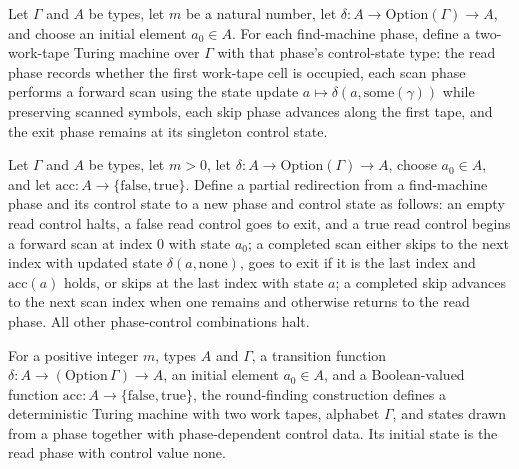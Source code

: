 \begin{definition}
\label{Turing.rt_findParts}
\leanok
{}
Let $\Gamma$ and $A$ be types, let $m$ be a natural number, let
$\delta:A\to\mathrm{Option}(\Gamma)\to A$, and choose an initial element $a_0\in A$. For
each find-machine phase, define a two-work-tape Turing machine over $\Gamma$ with that
phase's control-state type: the read phase records whether the first work-tape cell is
occupied, each scan phase performs a forward scan using the state update
$a\mapsto\delta(a,\mathrm{some}(\gamma))$ while preserving scanned symbols, each skip
phase advances along the first tape, and the exit phase remains at its singleton control
state.
\end{definition}

\begin{definition}
\label{Turing.rt_findRedirect}
\leanok
{}
Let $\Gamma$ and $A$ be types, let $m>0$, let $\delta:A\to\mathrm{Option}(\Gamma)\to A$,
choose $a_0\in A$, and let $\mathrm{acc}:A\to\{\mathrm{false},\mathrm{true}\}$. Define a
partial redirection from a find-machine phase and its control state to a new phase and
control state as follows: an empty read control halts, a false read control goes to
exit, and a true read control begins a forward scan at index $0$ with state $a_0$; a
completed scan either skips to the next index with updated state
$\delta(a,\mathrm{none})$, goes to exit if it is the last index and $\mathrm{acc}(a)$
holds, or skips at the last index with state $a$; a completed skip advances to the next
scan index when one remains and otherwise returns to the read phase. All other
phase-control combinations halt.
\end{definition}

\begin{definition}
\label{Turing.rt_findRound}
\leanok
{}
For a positive integer $m$, types $A$ and $\Gamma$, a transition function
$\delta:A\to(\mathrm{Option}\,\Gamma)\to A$, an initial element $a_0\in A$, and a
Boolean-valued function $\mathrm{acc}:A\to\{\mathrm{false},\mathrm{true}\}$, the
round-finding construction defines a deterministic Turing machine with two work tapes,
alphabet $\Gamma$, and states drawn from a phase together with phase-dependent control
data. Its initial state is the read phase with control value none.
\end{definition}

